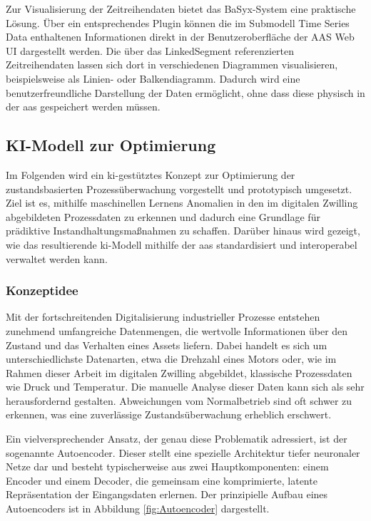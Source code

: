 Zur Visualisierung der Zeitreihendaten bietet das BaSyx-System eine praktische Lösung.
Über ein entsprechendes Plugin können die im Submodell Time Series Data enthaltenen Informationen direkt in der Benutzeroberfläche der AAS Web UI dargestellt werden.
Die über das LinkedSegment referenzierten Zeitreihendaten lassen sich dort in verschiedenen Diagrammen visualisieren, beispielsweise als Linien- oder Balkendiagramm.
Dadurch wird eine benutzerfreundliche Darstellung der Daten ermöglicht, ohne dass diese physisch in der \acs{aas} gespeichert werden müssen.

\subsection{KI-Modell zur Optimierung}
Im Folgenden wird ein \acs{ki}-gestütztes Konzept zur Optimierung der zustandsbasierten Prozessüberwachung vorgestellt und prototypisch umgesetzt.
Ziel ist es, mithilfe maschinellen Lernens Anomalien in den im digitalen Zwilling abgebildeten Prozessdaten zu erkennen und dadurch eine Grundlage für prädiktive Instandhaltungsmaßnahmen zu schaffen.
Darüber hinaus wird gezeigt, wie das resultierende \acs{ki}-Modell mithilfe der \acs{aas} standardisiert und interoperabel verwaltet werden kann.

\subsubsection{Konzeptidee}
Mit der fortschreitenden Digitalisierung industrieller Prozesse entstehen zunehmend umfangreiche Datenmengen, die wertvolle Informationen über den Zustand und das Verhalten eines Assets liefern. 
Dabei handelt es sich um unterschiedlichste Datenarten, etwa die Drehzahl eines Motors oder, wie im Rahmen dieser Arbeit im digitalen Zwilling abgebildet, klassische Prozessdaten wie Druck und Temperatur.
Die manuelle Analyse dieser Daten kann sich als sehr herausfordernd gestalten. Abweichungen vom Normalbetrieb sind oft schwer zu erkennen, was eine zuverlässige Zustandsüberwachung erheblich erschwert.

Ein vielversprechender Ansatz, der genau diese Problematik adressiert, ist der sogenannte Autoencoder. 
Dieser stellt eine spezielle Architektur tiefer neuronaler Netze dar und besteht typischerweise aus zwei Hauptkomponenten: einem Encoder und einem Decoder, die gemeinsam eine komprimierte, latente Repräsentation der Eingangsdaten erlernen.
\cite{Lempitsky2019}
Der prinzipielle Aufbau eines Autoencoders ist in Abbildung \ref{fig:Autoencoder} dargestellt.

